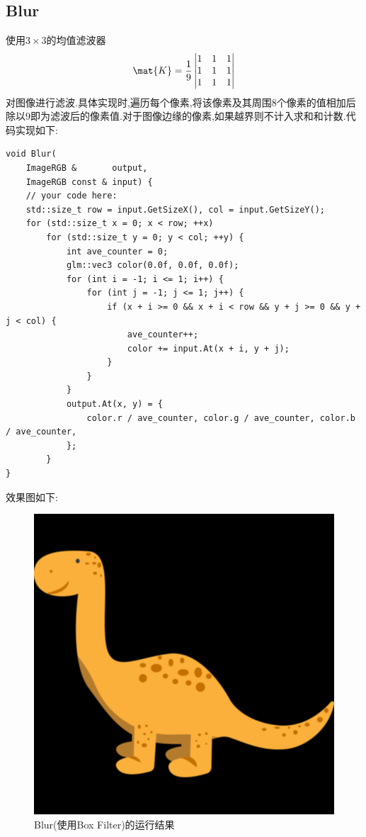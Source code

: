 \documentclass{ctexart}
\begin{document}
\subsection*{Blur}
使用$3\times3$的均值滤波器
\[\mat{K}=\dfrac19\begin{vmatrix}
    1&1&1\\
    1&1&1\\
    1&1&1
\end{vmatrix}\]
对图像进行滤波.具体实现时,遍历每个像素,将该像素及其周围8个像素的值相加后除以9即为滤波后的像素值.对于图像边缘的像素,如果越界则不计入求和和计数.代码实现如下:
\begin{lstlisting}
void Blur(
    ImageRGB &       output,
    ImageRGB const & input) {
    // your code here:
    std::size_t row = input.GetSizeX(), col = input.GetSizeY();
    for (std::size_t x = 0; x < row; ++x)
        for (std::size_t y = 0; y < col; ++y) {
            int ave_counter = 0;
            glm::vec3 color(0.0f, 0.0f, 0.0f);
            for (int i = -1; i <= 1; i++) {
                for (int j = -1; j <= 1; j++) {
                    if (x + i >= 0 && x + i < row && y + j >= 0 && y + j < col) {
                        ave_counter++;
                        color += input.At(x + i, y + j);
                    }
                }
            }
            output.At(x, y) = {
                color.r / ave_counter, color.g / ave_counter, color.b / ave_counter,
            };
        }
}
\end{lstlisting}
效果图如下:
\begin{figure}[H]
    \centering\includegraphics[scale=0.4]{figure/Blur.png}
    \caption{Blur(使用Box Filter)的运行结果}
\end{figure}
\end{document}
